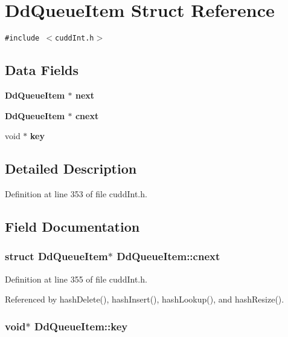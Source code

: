 \section{Dd\-Queue\-Item Struct Reference}
\label{structDdQueueItem}
{\tt \#include $<$cudd\-Int.h$>$}

\subsection*{Data Fields}
\begin{CompactItemize}
\item 
\bf{Dd\-Queue\-Item} $\ast$ \bf{next}
\item 
\bf{Dd\-Queue\-Item} $\ast$ \bf{cnext}
\item 
void $\ast$ \bf{key}
\end{CompactItemize}


\subsection{Detailed Description}




Definition at line 353 of file cudd\-Int.h.

\subsection{Field Documentation}
\subsubsection{\setlength{\rightskip}{0pt plus 5cm}struct \bf{Dd\-Queue\-Item}$\ast$ \bf{Dd\-Queue\-Item::cnext}}\label{structDdQueueItem_5500eae904c7432f4e08452c93c501fa}




Definition at line 355 of file cudd\-Int.h.

Referenced by hash\-Delete(), hash\-Insert(), hash\-Lookup(), and hash\-Resize().
\subsubsection{\setlength{\rightskip}{0pt plus 5cm}void$\ast$ \bf{Dd\-Queue\-Item::key}}\label{structDdQueueItem_5cf1de86b50815ab785c9a8d64f1a01c}




